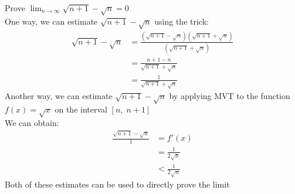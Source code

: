 \begin{eg}
    Prove $\lim _{n \to \infty} \sqrt{n+1} - \sqrt{n} = 0$ \\ 
    One way, we can estimate $\sqrt{n+1} - \sqrt{n}$ using the trick:
    \begin{align*}
        \sqrt{n+1} - \sqrt{n} &= \frac{(\sqrt{n+1} - \sqrt{n})(\sqrt{n+1} + \sqrt{n})}{(\sqrt{n+1} + \sqrt{n})} \\
        &= \frac{n+1-n}{\sqrt{n+1} + \sqrt{n}} \\
        &= \frac{1}{\sqrt{n+1} + \sqrt{n}}
    \end{align*}   
    Another way, we can estimate $\sqrt{n+1} - \sqrt{n}$ by applying MVT to the function $f(x) = \sqrt{x}$ on the interval $[n, \; n+1]$ \\
    We can obtain:
    \begin{align*}
        \frac{\sqrt{n+1} - \sqrt{n}}{1} &= f'(x) \\
        &= \frac{1}{2\sqrt{x}} \\
        &< \frac{1}{2\sqrt{n}}
    \end{align*}
    Both of these estimates can be used to directly prove the limit
\end{eg}

